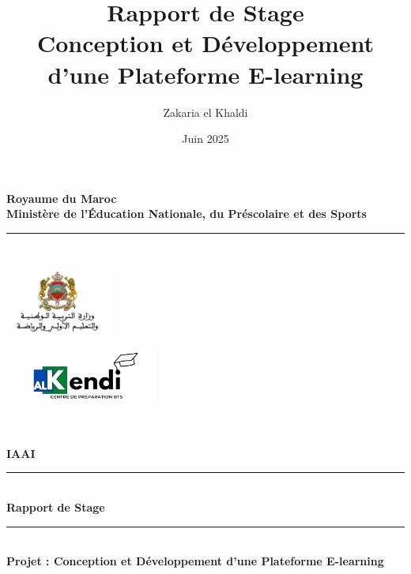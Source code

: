 \documentclass[12pt, a4paper]{report}
\title{\Huge\bfseries\color{primary} Rapport de Stage \\ 
       \Large Conception et Développement d'une Plateforme E-learning}
\author{\Large Zakaria el Khaldi}
\date{\large Juin 2025}
\begin{document}
\begin{titlepage}
    \centering
    {\LARGE \textbf{Royaume du Maroc}}\\[0.2cm]
    {\small \textbf{Ministère de l'Éducation Nationale, du Préscolaire et des Sports}}\\[0.2cm]
    \rule{\linewidth}{0.4mm} \\[0.4cm]

    \begin{minipage}{0.45\textwidth}
        \flushleft
        \includegraphics[width=3.5cm]{ministere.jpg}
    \end{minipage}
    \begin{minipage}{0.45\textwidth}
        \flushright
        \includegraphics[width=5cm]{bts_logo.png}
    \end{minipage}\\[1.3cm]

    \begin{tcolorbox}[colback=primary!10, colframe=primary, width=8cm, height=2.5cm, halign=center, valign=center]
        {\fontsize{40}{48}\selectfont\textcolor{primary}{\textbf{IAAI}}}
    \end{tcolorbox}
    
    \vspace{1.3cm}
    
    \rule{\linewidth}{0.4mm} \\[0.3cm]
    {\Huge \textbf{Rapport de Stage}}\\[0.3cm]
    \rule{\linewidth}{0.4mm} \\[0.7cm]
    
    {\large \textbf{Projet : Conception et Développement d'une Plateforme E-learning}}\\[1.5cm]
    

\end{titlepage}
\end{document}
